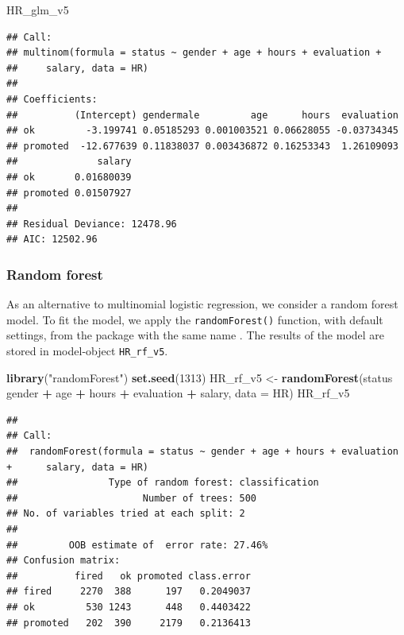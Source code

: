\documentclass[12pt,]{krantz}
\newenvironment{Shaded}{\begin{snugshade}}{\end{snugshade}}
\newcommand{\DataTypeTok}[1]{\textcolor[rgb]{0.13,0.29,0.53}{#1}}
\newcommand{\DecValTok}[1]{\textcolor[rgb]{0.00,0.00,0.81}{#1}}
\newcommand{\KeywordTok}[1]{\textcolor[rgb]{0.13,0.29,0.53}{\textbf{#1}}}
\newcommand{\NormalTok}[1]{#1}
\newcommand{\OperatorTok}[1]{\textcolor[rgb]{0.81,0.36,0.00}{\textbf{#1}}}
\newcommand{\StringTok}[1]{\textcolor[rgb]{0.31,0.60,0.02}{#1}}
\begin{document}
\begin{Shaded}
\begin{Highlighting}[]
\NormalTok{HR_glm_v5}
\end{Highlighting}
\end{Shaded}

\begin{verbatim}
## Call:
## multinom(formula = status ~ gender + age + hours + evaluation + 
##     salary, data = HR)
## 
## Coefficients:
##          (Intercept) gendermale         age      hours  evaluation
## ok         -3.199741 0.05185293 0.001003521 0.06628055 -0.03734345
## promoted  -12.677639 0.11838037 0.003436872 0.16253343  1.26109093
##              salary
## ok       0.01680039
## promoted 0.01507927
## 
## Residual Deviance: 12478.96 
## AIC: 12502.96
\end{verbatim}

\hypertarget{model-HR-rf}{%
\subsubsection{Random forest}\label{model-HR-rf}}

As an alternative to multinomial logistic regression, we consider a random forest model. To fit the model, we apply the \texttt{randomForest()} function, with default settings, from the package with the same name \citep{randomForestRNews}.
The results of the model are stored in model-object \texttt{HR\_rf\_v5}.

\begin{Shaded}
\begin{Highlighting}[]
\KeywordTok{library}\NormalTok{(}\StringTok{"randomForest"}\NormalTok{)}
\KeywordTok{set.seed}\NormalTok{(}\DecValTok{1313}\NormalTok{)}
\NormalTok{HR_rf_v5 <-}\StringTok{ }\KeywordTok{randomForest}\NormalTok{(status }\OperatorTok{~}\StringTok{ }\NormalTok{gender }\OperatorTok{+}\StringTok{ }\NormalTok{age }\OperatorTok{+}\StringTok{ }\NormalTok{hours }\OperatorTok{+}\StringTok{ }\NormalTok{evaluation }\OperatorTok{+}\StringTok{ }\NormalTok{salary, }\DataTypeTok{data =}\NormalTok{ HR)}
\NormalTok{HR_rf_v5}
\end{Highlighting}
\end{Shaded}

\begin{verbatim}
## 
## Call:
##  randomForest(formula = status ~ gender + age + hours + evaluation +      salary, data = HR) 
##                Type of random forest: classification
##                      Number of trees: 500
## No. of variables tried at each split: 2
## 
##         OOB estimate of  error rate: 27.46%
## Confusion matrix:
##          fired   ok promoted class.error
## fired     2270  388      197   0.2049037
## ok         530 1243      448   0.4403422
## promoted   202  390     2179   0.2136413
\end{verbatim}
\end{document}
